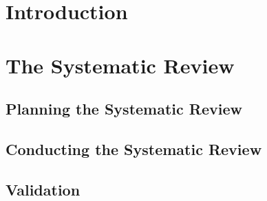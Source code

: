 

\begin{abstract}

\end{abstract}





%
\IEEEpeerreviewmaketitle

\section{Introduction}\label{introduction}
	

%	

\section{The Systematic Review}\label{method}
	
	\subsection{Planning the Systematic Review\label{planning}}
		
	\subsection{Conducting the Systematic Review\label{conducting}}
		
	\subsection{Validation\label{validation}}
			
